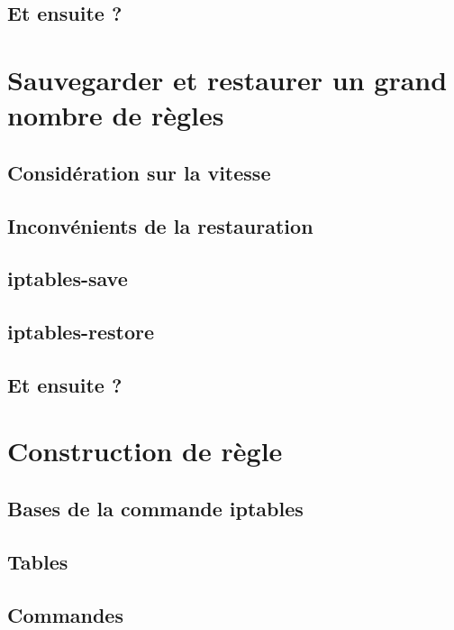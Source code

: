 \documentclass[a4paper,11pt]{report}
\begin{document}
\section{Et ensuite ?}

\chapter{Sauvegarder et restaurer un grand nombre de règles}

\section{Considération sur la vitesse}

\section{Inconvénients de la restauration}

\section{iptables-save}

\section{iptables-restore}

\section{Et ensuite ?}

\chapter{Construction de règle}

\section{Bases de la commande iptables}

\section{Tables}

\section{Commandes}
\end{document}
